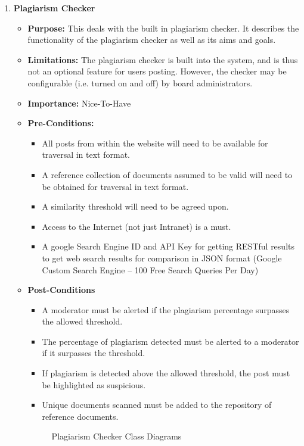 \documentclass[11pt]{article}
\begin{document}
\begin{enumerate}
\item \textbf{Plagiarism Checker}
\graphicspath{ {../Diagrams/Tienie/Plagiarism/}}
	\begin{itemize}
		\item \textbf{Purpose: }
			This deals with the built in plagiarism checker. It describes the functionality of the plagiarism checker as well as its aims and goals.
		\newline
		\item \textbf{Limitations:} 
		The plagiarism checker is built into the system, and is thus not an optional feature for users posting. However, the checker may be configurable (i.e. turned on and off) by board administrators.
		\item 	\textbf{Importance: } Nice-To-Have
		\item 	\textbf{Pre-Conditions: }
			\begin{itemize}
	  			\item All posts from within the website will need to be available for traversal in text format.
	  			\item A reference collection of documents assumed to be valid will need to be obtained for traversal in text format.
	  			\item A similarity threshold will need to be agreed upon.
		 		\item Access to the Internet (not just Intranet) is a must.
		  		\item A google Search Engine ID and API Key for getting RESTful results to get web search results for comparison in JSON format (Google Custom Search Engine – 100 Free Search Queries Per Day)
		  	\end{itemize}
		\item	\textbf{Post-Conditions}
		  	\begin{itemize}
	  			\item A moderator must be alerted if the plagiarism percentage surpasses the allowed threshold.
		  		\item The percentage of plagiarism detected must be alerted to a moderator if it surpasses the threshold.
	 			\item If plagiarism is detected above the allowed threshold, the post must be highlighted as suspicious.
		  		\item Unique documents scanned must be added to the repository of reference documents.
		  	\end{itemize}
		  	\newpage
	  			\begin{figure}[H]
	  				\caption{Plagiarism Checker Class Diagrams}

\end{figure}
\end{itemize}
\end{enumerate}
\end{document}
